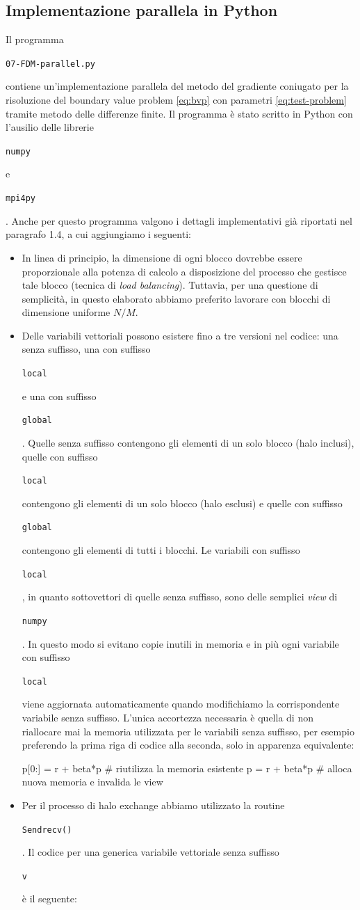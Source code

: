 \documentclass[a4paper,11pt]{article}
\newcommand{\code}[1]{\begin{small}\texttt{#1}\end{small}}
\begin{document}
\subsection{Implementazione parallela in Python}
Il programma \code{07-FDM-parallel.py} contiene un'implementazione
parallela del metodo del gradiente coniugato per la risoluzione
del boundary value problem \eqref{eq:bvp} con parametri
\eqref{eq:test-problem} tramite metodo delle differenze finite.
Il programma è stato scritto in Python con l'ausilio delle
librerie \code{numpy} e \code{mpi4py}. Anche per questo programma
valgono i dettagli implementativi già riportati nel paragrafo
1.4, a cui aggiungiamo i seguenti:
\begin{itemize}
\item In linea di principio, la dimensione di ogni blocco
dovrebbe essere proporzionale alla potenza di calcolo
a disposizione del processo che gestisce tale blocco
(tecnica di \emph{load balancing}). Tuttavia, per una
questione di semplicità, in questo elaborato abbiamo
preferito lavorare con blocchi di dimensione uniforme $N/M$.
\item Delle variabili vettoriali possono esistere fino a tre
versioni nel codice: una senza suffisso, una con suffisso
\code{local} e una con suffisso \code{global}. Quelle senza suffisso
contengono gli elementi di un solo blocco (halo inclusi),
quelle con suffisso \code{local} contengono gli elementi
di un solo blocco (halo esclusi) e quelle con suffisso
\code{global} contengono gli elementi di tutti i blocchi.
Le variabili con suffisso \code{local}, in quanto sottovettori
di quelle senza suffisso, sono delle semplici \emph{view}
di \code{numpy}. In questo modo si evitano copie inutili
in memoria e in più ogni variabile con suffisso \code{local} viene
aggiornata automaticamente quando modifichiamo la corrispondente
variabile senza suffisso. L'unica accortezza necessaria è
quella di non riallocare mai la memoria utilizzata per le
variabili senza suffisso, per esempio
preferendo la prima riga di codice alla seconda, solo in
apparenza equivalente:
\begin{python}
p[0:] = r + beta*p  # riutilizza la memoria esistente
p = r + beta*p      # alloca nuova memoria e invalida le view
\end{python}
\item Per il processo di halo exchange abbiamo
utilizzato la routine \code{Sendrecv()}. Il codice per
una generica variabile vettoriale senza suffisso \code{v}
è il seguente:
\begin{python}

\end{python}
\end{itemize}
\end{document}
